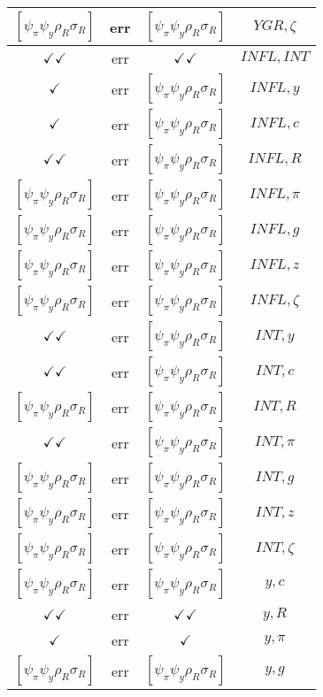 \documentclass[a4paper,10pt]{article}
\begin{document}
\begin{longtable}{|c|c|c|c|}
\hline
$[\psi_\pi \psi_y \rho_R \sigma_R ]$ & err & $[\psi_\pi \psi_y \rho_R \sigma_R ]$ & ${YGR},{\zeta}$ \\
\hline
$\checkmark\checkmark$ & err & $\checkmark\checkmark$ & ${INFL},{INT}$ \\
\hline
$\checkmark$ & err & $[\psi_\pi \psi_y \rho_R \sigma_R ]$ & ${INFL},{y}$ \\
\hline
$\checkmark$ & err & $[\psi_\pi \psi_y \rho_R \sigma_R ]$ & ${INFL},{c}$ \\
\hline
$\checkmark\checkmark$ & err & $[\psi_\pi \psi_y \rho_R \sigma_R ]$ & ${INFL},{R}$ \\
\hline
$[\psi_\pi \psi_y \rho_R \sigma_R ]$ & err & $[\psi_\pi \psi_y \rho_R \sigma_R ]$ & ${INFL},{\pi}$ \\
\hline
$[\psi_\pi \psi_y \rho_R \sigma_R ]$ & err & $[\psi_\pi \psi_y \rho_R \sigma_R ]$ & ${INFL},{g}$ \\
\hline
$[\psi_\pi \psi_y \rho_R \sigma_R ]$ & err & $[\psi_\pi \psi_y \rho_R \sigma_R ]$ & ${INFL},{z}$ \\
\hline
$[\psi_\pi \psi_y \rho_R \sigma_R ]$ & err & $[\psi_\pi \psi_y \rho_R \sigma_R ]$ & ${INFL},{\zeta}$ \\
\hline
$\checkmark\checkmark$ & err & $[\psi_\pi \psi_y \rho_R \sigma_R ]$ & ${INT},{y}$ \\
\hline
$\checkmark\checkmark$ & err & $[\psi_\pi \psi_y \rho_R \sigma_R ]$ & ${INT},{c}$ \\
\hline
$[\psi_\pi \psi_y \rho_R \sigma_R ]$ & err & $[\psi_\pi \psi_y \rho_R \sigma_R ]$ & ${INT},{R}$ \\
\hline
$\checkmark\checkmark$ & err & $[\psi_\pi \psi_y \rho_R \sigma_R ]$ & ${INT},{\pi}$ \\
\hline
$[\psi_\pi \psi_y \rho_R \sigma_R ]$ & err & $[\psi_\pi \psi_y \rho_R \sigma_R ]$ & ${INT},{g}$ \\
\hline
$[\psi_\pi \psi_y \rho_R \sigma_R ]$ & err & $[\psi_\pi \psi_y \rho_R \sigma_R ]$ & ${INT},{z}$ \\
\hline
$[\psi_\pi \psi_y \rho_R \sigma_R ]$ & err & $[\psi_\pi \psi_y \rho_R \sigma_R ]$ & ${INT},{\zeta}$ \\
\hline
$[\psi_\pi \psi_y \rho_R \sigma_R ]$ & err & $[\psi_\pi \psi_y \rho_R \sigma_R ]$ & ${y},{c}$ \\
\hline
$\checkmark\checkmark$ & err & $\checkmark\checkmark$ & ${y},{R}$ \\
\hline
$\checkmark$ & err & $\checkmark$ & ${y},{\pi}$ \\
\hline
$[\psi_\pi \psi_y \rho_R \sigma_R ]$ & err & $[\psi_\pi \psi_y \rho_R \sigma_R ]$ & ${y},{g}$ \\

\end{longtable}
\end{document}
